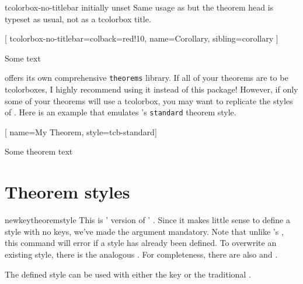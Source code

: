 \documentclass{ltxdoc}
\begin{document}
\begin{docKey}{tcolorbox-no-titlebar}
  {}
  {initially unset}
Same usage as  but the theorem head is typeset as usual, not as a tcolorbox title.

\begin{tcbwritetemp}
[
  tcolorbox-no-titlebar={colback=red!10},
  name=Corollary, sibling=corollary
  ]
\end{tcbwritetemp}

\begin{keythmscode}[withpreamble]
\begin{boxcor}
Some text
\end{boxcor}
\end{keythmscode}

\end{docKey}

 offers its own comprehensive \texttt{theorems} library. If all of your theorems are to be tcolorboxes, I highly recommend using it instead of this package! However, if only some of your theorems will use a tcolorbox, you may want to replicate the styles of . Here is an example that emulates 's \texttt{standard} theorem style.

\begin{tcbwritetemp}
[
  name=My Theorem,
  style=tcb-standard]
\end{tcbwritetemp}

\begin{keythmscode}[withpreamble]
\begin{mytheo}
Some theorem text
\end{mytheo}
\end{keythmscode}

\section{Theorem styles}
\label{thmstyles}

\begin{docCommand}{newkeytheoremstyle}
  {}
This is ' version of ' .
Since it makes little sense to define a style with no keys, we've made the  argument mandatory.
Note that unlike 's , this command will error if a style has already been defined.
To overwrite an existing style, there is the analogous .
For completeness, there are also  and .

The defined style can be used with either the  key or the traditional .
\end{docCommand}
\end{document}
